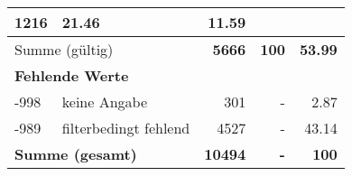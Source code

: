 \begin{longtable}{lXrrr}
       \num{1216} &
       \num[round-mode=places,round-precision=2]{21.46} &
         \num[round-mode=places,round-precision=2]{11.59} \\
     \midrule
     \multicolumn{2}{l}{Summe (gültig)} &
       \textbf{\num{5666}} &
     \textbf{\num{100}} &
       \textbf{\num[round-mode=places,round-precision=2]{53.99}} \\
     \multicolumn{5}{l}{\textbf{Fehlende Werte}}\\
       -998 &
       keine Angabe &
         \num{301} &
        - &
         \num[round-mode=places,round-precision=2]{2.87} \\
       -989 &
       filterbedingt fehlend &
         \num{4527} &
        - &
         \num[round-mode=places,round-precision=2]{43.14} \\
     \midrule
     \multicolumn{2}{l}{\textbf{Summe (gesamt)}} &
          \textbf{\num{10494}} &
        \textbf{-} &
        \textbf{\num{100}} \\
     \bottomrule
     \end{longtable}
     
